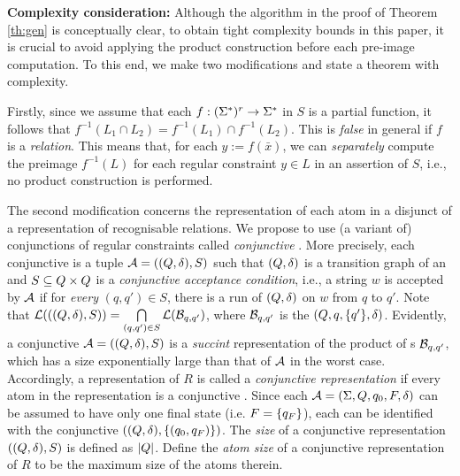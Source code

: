 %
\smallskip
\noindent
\textbf{Complexity consideration: }
Although the algorithm in the proof of Theorem \ref{th:gen} is conceptually 
clear, to obtain tight complexity bounds in this paper, it is crucial to 
avoid applying the product construction before each pre-image computation.
To this end, we make two modifications and state a theorem with complexity. 

Firstly,
since we assume that each $f: (\Sigma^*)^r \to \Sigma^*$
in $S$ is a partial function, it follows that $f^{-1}(L_1 \cap L_2) = 
f^{-1}(L_1) \cap f^{-1}(L_2)$. This is \emph{false} in general if $f$ is a \emph{relation}.
This means that, for each $y := f(\bar x)$, we can \emph{separately} compute 
the preimage $f^{-1}(L)$ for each regular constraint $y \in L$ in an assertion
of $S$, i.e., no product construction is performed.

The second modification concerns the representation of each atom
in a disjunct of a representation of recognisable relations. We propose
to use (a variant of) conjunctions of regular constraints called
\emph{conjunctive \FA{}}. 
More precisely, each conjunctive \FA{} is a tuple $\mathcal{A} = ((Q, \delta), S)$
such that $(Q, \delta)$ is a transition graph of an \FA{} and 
$S \subseteq Q \times Q$ is a \emph{conjunctive acceptance 
condition}, i.e., a string $w$ is accepted by $\mathcal{A}$ if 
for \emph{every} $(q, q') \in S$, there is a run of $(Q, \delta)$ on
$w$ from $q$ to $q'$. 
%
Note that $\mathcal{L}(((Q, \delta), S)) = \bigcap \limits_{(q,q') \in S} \mathcal{L}(\mathcal{B}_{q,q'})$, where $\mathcal{B}_{q,q'}$ is the \FA{} $(Q, q, \{q'\}, \delta)$. Evidently, a  conjunctive \FA{} $\mathcal{A}=((Q, \delta), S)$ is a \emph{succint} representation of the product of \FA{}s $\mathcal{B}_{q,q'}$, which has a size exponentially large than that of $\mathcal{A}$ in the worst case.
%
%
Accordingly, a representation of $R$ is called a \emph{conjunctive
representation} if every atom in the representation is a conjunctive \FA{}.
Since each \FA{} $\mathcal{A} = 
(\Sigma, Q, q_0, F, \delta)$
can be assumed to have only one final state (i.e. $F = \{q_F\}$), each 
\FA{} can be identified with the conjunctive \FA{}
$((Q,\delta),\{(q_0,q_F)\})$.
The \emph{size} of a conjunctive representation $((Q, \delta), S)$ is defined as $|Q|$. Define the  \emph{atom size} of a conjunctive representation of $R$ to be the maximum size of the atoms therein.

